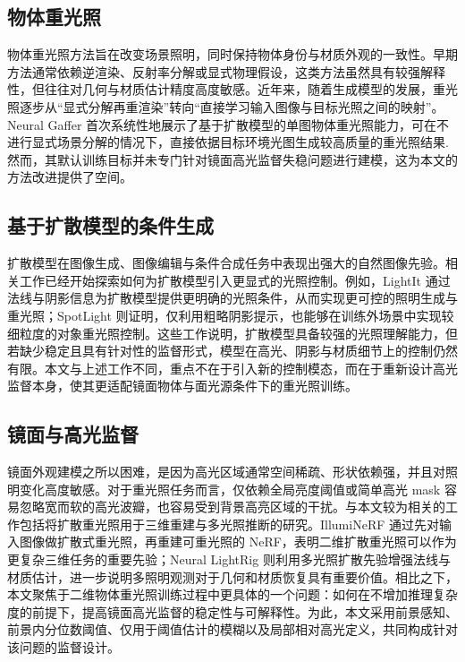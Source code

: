 \documentclass[UTF8,a4paper]{ctexart}
\begin{document}
\subsection{物体重光照}

物体重光照方法旨在改变场景照明，同时保持物体身份与材质外观的一致性。早期方法通常依赖逆渲染、反射率分解或显式物理假设，这类方法虽然具有较强解释性，但往往对几何与材质估计精度高度敏感。近年来，随着生成模型的发展，重光照逐步从“显式分解再重渲染”转向“直接学习输入图像与目标光照之间的映射”。Neural Gaffer 首次系统性地展示了基于扩散模型的单图物体重光照能力，可在不进行显式场景分解的情况下，直接依据目标环境光图生成较高质量的重光照结果\cite{ref_ng}. 然而，其默认训练目标并未专门针对镜面高光监督失稳问题进行建模，这为本文的方法改进提供了空间。

\subsection{基于扩散模型的条件生成}

扩散模型在图像生成、图像编辑与条件合成任务中表现出强大的自然图像先验。相关工作已经开始探索如何为扩散模型引入更显式的光照控制。例如，LightIt 通过法线与阴影信息为扩散模型提供更明确的光照条件，从而实现更可控的照明生成与重光照\cite{ref_lightit}；SpotLight 则证明，仅利用粗略阴影提示，也能够在训练外场景中实现较细粒度的对象重光照控制\cite{ref_spotlight}。这些工作说明，扩散模型具备较强的光照理解能力，但若缺少稳定且具有针对性的监督形式，模型在高光、阴影与材质细节上的控制仍然有限。本文与上述工作不同，重点不在于引入新的控制模态，而在于重新设计高光监督本身，使其更适配镜面物体与面光源条件下的重光照训练。

\subsection{镜面与高光监督}

镜面外观建模之所以困难，是因为高光区域通常空间稀疏、形状依赖强，并且对照明变化高度敏感。对于重光照任务而言，仅依赖全局亮度阈值或简单高光 mask 容易忽略宽而软的高光波瓣，也容易受到背景高亮区域的干扰。与本文较为相关的工作包括将扩散重光照用于三维重建与多光照推断的研究。IllumiNeRF 通过先对输入图像做扩散式重光照，再重建可重光照的 NeRF，表明二维扩散重光照可以作为更复杂三维任务的重要先验\cite{ref_illuminerf}；Neural LightRig 则利用多光照扩散先验增强法线与材质估计，进一步说明多照明观测对于几何和材质恢复具有重要价值\cite{ref_lightrig}。相比之下，本文聚焦于二维物体重光照训练过程中更具体的一个问题：如何在不增加推理复杂度的前提下，提高镜面高光监督的稳定性与可解释性。为此，本文采用前景感知、前景内分位数阈值、仅用于阈值估计的模糊以及局部相对高光定义，共同构成针对该问题的监督设计。
\end{document}
